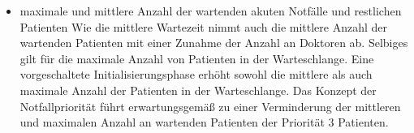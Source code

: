 \documentclass[12pt,fleqn,a4paper]{article}
\begin{document}
\begin{itemize}
	\item maximale und mittlere Anzahl der wartenden akuten Notf\"{a}lle und restlichen Patienten \newline
	Wie die mittlere Wartezeit nimmt auch die mittlere Anzahl der wartenden Patienten mit einer Zunahme der Anzahl an Doktoren ab. Selbiges gilt f\"{u}r die maximale Anzahl von Patienten in der Warteschlange. Eine vorgeschaltete Initialisierungsphase erh\"{o}ht sowohl die mittlere als auch maximale Anzahl der Patienten in der Warteschlange.
Das Konzept der Notfallpriorit\"{a}t f\"{u}hrt erwartungsgem\"{a}{\ss} zu einer Verminderung der mittleren und maximalen Anzahl an wartenden Patienten der Priorit\"{a}t 3 Patienten.
	
\end{itemize}
\end{document}
